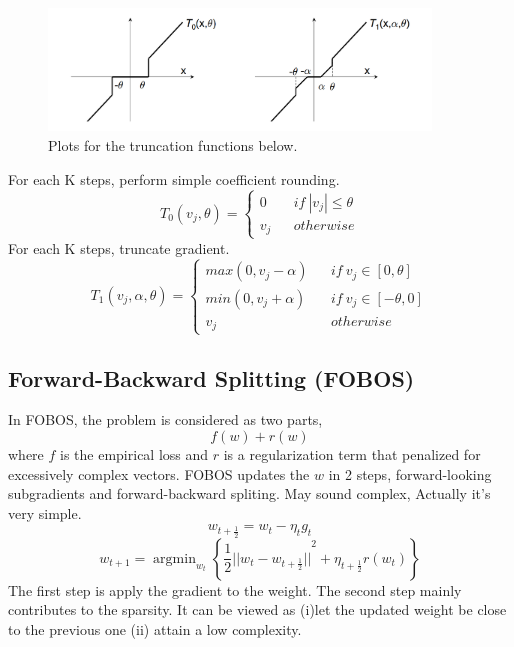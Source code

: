 \documentclass{article}
\begin{document}
\begin{figure}[h]
\centering
\includegraphics[width=4in,height=1.3in]{figure1}
\caption{Plots for the truncation functions below.}
\end{figure}

\noindent
For each K steps, perform simple coefficient rounding.
$$ T_{0}(v_{j},\theta)=\left\{
\begin{array}{lcl}
0       &      & {if \  \left| v_{j} \right| \leq \theta}\\
v_{j}     &      & {otherwise}
\end{array} \right. $$
For each K steps, truncate gradient.
$$ T_{1}(v_{j},\alpha,\theta)=\left\{  
\begin{array}{lcl}
max(0,v_{j}-\alpha)       &      & {if \ v_{j} \in [0,\theta]} \\
min(0,v_{j}+\alpha)       &      & {if \ v_{j} \in [-\theta,0]} \\
v_{j}     &      & {otherwise}
\end{array} \right. $$
\subsection{Forward-Backward Splitting (FOBOS)}
In FOBOS\cite{DBLP:journals/jmlr/DuchiS09}, the problem is considered as two parts,
$$f(w)+r(w)$$
where $f$ is the empirical loss and $r$ is a regularization term that penalized for excessively complex vectors.
FOBOS updates the $w$ in 2 steps, forward-looking subgradients and forward-backward spliting. May sound complex, Actually it's very simple. 
$$w_{t+\frac{1}{2}}=w_{t}-\eta_{t} g_{t}$$
$$w_{t+1}=\mathop{\arg\min}_{w_{t}} \left \{ {\frac{1}{2} || w_{t}-w_{t+\frac{1}{2}}||}^{2}+\eta_{t+\frac{1}{2}}r(w_{t}) \right \} $$
The first step is apply the gradient to the weight. The second step mainly contributes to the sparsity. It can be viewed as (\textrm{i})let the updated weight be close to the previous one (\textrm{ii}) attain a low complexity.
\end{document}
